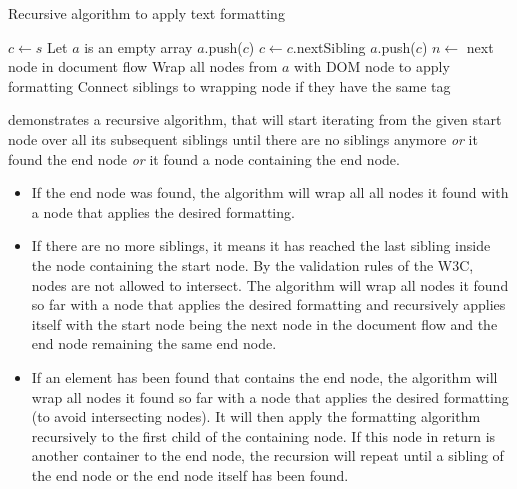 \begin{algorithm}
\caption{Recursive algorithm to apply text formatting}
\label{alg:text_formatting}
\begin{algorithmic}[1]
    \State $c \gets s$
    \State Let $a$ is an empty array
      \State $a$.push($c$)
      \State $c \gets c$.nextSibling
     \EndWhile
      \State $a$.push($c$)
     \EndIf
      \State {}
     \EndIf
      \State $n \gets $ next node in document flow
      \State {}
     \EndIf
     \State Wrap all nodes from $a$ with DOM node to apply formatting
     \State Connect siblings to wrapping node if they have the same tag
  \EndProcedure
\end{algorithmic}
\end{algorithm}

 demonstrates a recursive algorithm, that will start iterating from the given start node over all its subsequent siblings until there are no siblings anymore \textit{or} it found the end node \textit{or} it found a node containing the end node.

\begin{itemize}

\item If the end node was found, the algorithm will wrap all all nodes it found with a node that applies the desired formatting.

\item If there are no more siblings, it means it has reached the last sibling inside the node containing the start node. By the validation rules of the W3C, nodes are not allowed to intersect. The algorithm will wrap all nodes it found so far with a node that applies the desired formatting and recursively applies itself with the start node being the next node in the document flow and the end node remaining the same end node.

\item If an element has been found that contains the end node, the algorithm will wrap all nodes it found so far with a node that applies the desired formatting (to avoid intersecting nodes). It will then apply the formatting algorithm recursively to the first child of the containing node. If this node in return is another container to the end node, the recursion will repeat until a sibling of the end node or the end node itself has been found.

\end{itemize}

